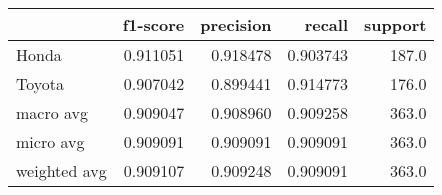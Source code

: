 \begin{tabular}{lrrrr}
\toprule
{} &  f1-score &  precision &    recall &  support \\
\midrule
Honda        &  0.911051 &   0.918478 &  0.903743 &    187.0 \\
Toyota       &  0.907042 &   0.899441 &  0.914773 &    176.0 \\
macro avg    &  0.909047 &   0.908960 &  0.909258 &    363.0 \\
micro avg    &  0.909091 &   0.909091 &  0.909091 &    363.0 \\
weighted avg &  0.909107 &   0.909248 &  0.909091 &    363.0 \\
\bottomrule
\end{tabular}
